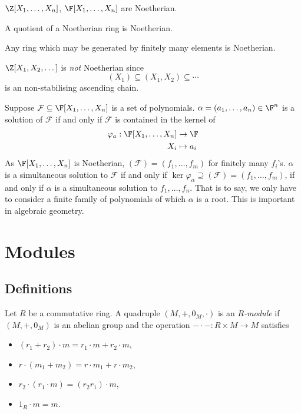 \documentclass[a4paper]{article}
\theoremstyle{definition}
\begin{document}
\begin{eg}
  \(\Z[X_1, \dots, X_n]\), \(\F[X_1, \dots, X_n]\) are Noetherian.
\end{eg}

\begin{lemma}
  A quotient of a Noetherian ring is Noetherian.
\end{lemma}

\begin{corollary}
  Any ring which may be generated by finitely many elements is Noetherian.
\end{corollary}

\begin{eg}
  \(\Z[X_1, X_2, \dots]\) is \emph{not} Noetherian since
  \[
    (X_1) \subseteq (X_1, X_2) \subseteq \cdots
  \]
  is an non-stabilising ascending chain.
\end{eg}

\begin{remark}
  Suppose \(\mathcal F \subseteq \F[X_1, \dots, X_n]\) is a set of polynomials. \(\alpha = (a_1, \dots, a_n) \in \F^n\) is a solution of \(\mathcal F\) if and only if \(\mathcal F\) is contained in the kernel of
  \begin{align*}
    \varphi_a: \F[X_1, \dots, X_n] &\to \F \\
    X_i &\mapsto a_i
  \end{align*}
  As \(\F[X_1, \dots, X_n]\) is Noetherian, \((\mathcal F) = (f_1, \dots, f_m)\) for finitely many \(f_i\)'s. \(\alpha\) is a simultaneous solution to \(\mathcal F\) if and only if \(\ker \varphi_\alpha \supseteq (\mathcal F) = (f_1, \dots, f_m)\), if and only if \(\alpha\) is a simultaneous solution to \(f_1, \dots, f_n\). That is to say, we only have to consider a finite family of polynomials of which \(\alpha\) is a root. This is important in algebraic geometry.
\end{remark}

\section{Modules}

\subsection{Definitions}

\begin{definition}[Module]
  Let \(R\) be a commutative ring. A quadruple \((M, +, 0_M, \cdot)\) is an \emph{\(R\)-module} if \((M, +, 0_M)\) is an abelian group and the operation \(- \cdot -: R \times M \to M\) satisfies
  \begin{itemize}
  \item \((r_1 + r_2) \cdot m = r_1 \cdot m + r_2 \cdot m\),
  \item \(r \cdot (m_1 + m_2) = r \cdot m_1 + r \cdot m_2\),
  \item \(r_2 \cdot (r_1 \cdot m) = (r_2r_1) \cdot m\),
  \item \(1_R \cdot m = m\).
  \end{itemize}
\end{definition}
\end{document}
